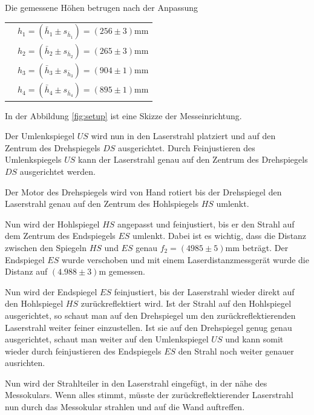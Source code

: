 Die gemessene H\"ohen betrugen nach der Anpassung

\begin{tabular}{ll}
    \hspace{4mm}
    & $h_1 = (\bar{h}_1 \pm s_{\bar{h}_1}) = (256\pm3)\textrm{mm}$ \\
    & $h_2 = (\bar{h}_2 \pm s_{\bar{h}_2}) = (265\pm3)\textrm{mm}$ \\
    & $h_3 = (\bar{h}_3 \pm s_{\bar{h}_3}) = (904\pm1)\textrm{mm}$ \\
    & $h_4 = (\bar{h}_4 \pm s_{\bar{h}_4}) = (895\pm1)\textrm{mm}$ \\
\end{tabular}

In der Abbildung \ref{fig:setup} ist eine Skizze der Messeinrichtung.

Der  Umlenkspiegel  $US$  wird  nun  in  den  Laserstrahl  platziert  und  auf
den  Zentrum  des Drehspiegels  $DS$  ausgerichtet.   Durch Feinjustieren  des
Umlenkspiegels  $US$   kann  der  Laserstrahl   genau  auf  den   Zentrum  des
Drehspiegels $DS$ ausgerichtet werden.

Der  Motor des  Drehspiegels wird  von Hand  rotiert bis  der Drehspiegel  den
Laserstrahl genau auf den Zentrum des Hohlspiegels $HS$ umlenkt.

Nun  wird  der  Hohlspiegel  $HS$  angepasst  und  feinjustiert,  bis  er  den
Strahl auf  dem Zentrum  des Endspiegels $ES$  umlenkt. Dabei ist  es wichtig,
dass  die  Distanz   zwischen  den  Spiegeln  $HS$  und  $ES$   genau  $f_2  =
(4985\pm5)\textrm{mm}$ betr\"agt. Der Endspiegel $ES$ wurde verschoben und mit
einem  Laserdistanzmessger\"at wurde  die Distanz  auf $(4.988\pm3)\textrm{m}$
gemessen.

Nun  wird  der  Endspiegel  $ES$  feinjustiert,  bis  der  Laserstrahl  wieder
direkt  auf  den Hohlspiegel  $HS$  zur\"uckreflektiert  wird. Ist der  Strahl
auf  den  Hohlspiegel ausgerichtet,  so  schaut  man  auf den  Drehspiegel  um
den  zur\"uckreflektierenden Laserstrahl  weiter feiner  einzustellen. Ist sie
auf  den Drehspiegel  genug  genau  ausgerichtet, schaut  man  weiter auf  den
Umlenkspiegel $US$ und  kann somit wieder durch  feinjustieren des Endspiegels
$ES$ den Strahl noch weiter genauer ausrichten.

Nun wird der Strahlteiler in den Laserstrahl eingef\"ugt, in der n\"ahe des
Messokulars. Wenn alles stimmt, m\"usste der zur\"uckreflektierender Laserstrahl
nun durch das Messokular strahlen und auf die Wand auftreffen.

